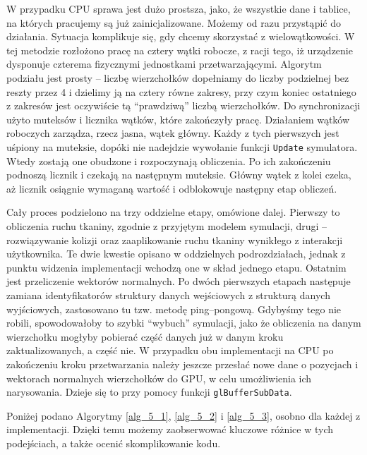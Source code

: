 		W przypadku CPU sprawa jest dużo prostsza, jako, że wszystkie dane i tablice, na których pracujemy są już zainicjalizowane. Możemy od razu przystąpić do działania. Sytuacja komplikuje się, gdy chcemy skorzystać z wielowątkowości. W tej metodzie rozłożono pracę na cztery wątki robocze, z racji tego, iż urządzenie dysponuje czterema fizycznymi jednostkami przetwarzającymi. Algorytm podziału jest prosty -- liczbę wierzchołków dopełniamy do liczby podzielnej bez reszty przez 4 i dzielimy ją na cztery równe zakresy, przy czym koniec ostatniego z zakresów jest oczywiście tą ``prawdziwą'' liczbą wierzchołków. Do synchronizacji użyto muteksów i licznika wątków, które zakończyły pracę. Działaniem wątków roboczych zarządza, rzecz jasna, wątek główny. Każdy z tych pierwszych jest uśpiony na muteksie, dopóki nie nadejdzie wywołanie funkcji \texttt{Update} symulatora. Wtedy zostają one obudzone i rozpoczynają obliczenia. Po ich zakończeniu podnoszą licznik i czekają na następnym muteksie. Główny wątek z kolei czeka, aż licznik osiągnie wymaganą wartość i odblokowuje następny etap obliczeń.
		
		Cały proces podzielono na trzy oddzielne etapy, omówione dalej. Pierwszy to obliczenia ruchu tkaniny, zgodnie z przyjętym modelem symulacji, drugi -- rozwiązywanie kolizji oraz zaaplikowanie ruchu tkaniny wynikłego z interakcji użytkownika. Te dwie kwestie opisano w oddzielnych podrozdziałach, jednak z punktu widzenia implementacji wchodzą one w skład jednego etapu. Ostatnim jest przeliczenie wektorów normalnych. Po dwóch pierwszych etapach następuje zamiana identyfikatorów struktury danych wejściowych z strukturą danych wyjściowych, zastosowano tu tzw. metodę ping--pongową. Gdybyśmy tego nie robili, spowodowałoby to szybki ``wybuch'' symulacji, jako że obliczenia na danym wierzchołku mogłyby pobierać część danych już w danym kroku zaktualizowanych, a część nie. W przypadku obu implementacji na CPU po zakończeniu kroku przetwarzania należy jeszcze przesłać nowe dane o pozycjach i wektorach normalnych wierzchołków do GPU, w celu umożliwienia ich narysowania. Dzieje się to przy pomocy funkcji \texttt{glBufferSubData}.
		
		Poniżej podano Algorytmy \ref{alg_5_1}, \ref{alg_5_2} i \ref{alg_5_3}, osobno dla każdej z implementacji. Dzięki temu możemy zaobserwować kluczowe różnice w tych podejściach, a także ocenić skomplikowanie kodu.
		
